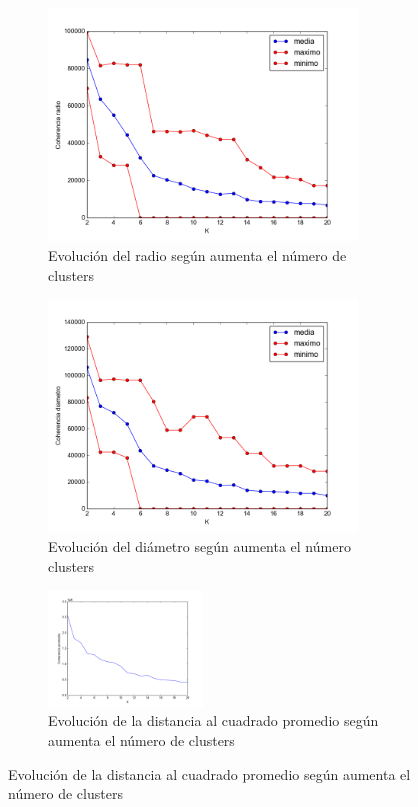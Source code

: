 \documentclass[11pt,a4paper]{article}
\begin{document}
\begin{figure}[h]
\begin{subfigure}{0.45\textwidth}
  \centering
    \includegraphics[width=0.9\textwidth]{img/radio_maxMin.png}
    \caption{Evolución del radio según aumenta el número de clusters}
    \label{fig:radio} 
\end{subfigure}
\hspace{0.1\textwidth}
\begin{subfigure}{0.45\textwidth}
    \includegraphics[width=0.9\textwidth]{img/diametro_maxMin.png}
    \caption{Evolución del diámetro según aumenta el número clusters}
    \label{fig:diametro}
\end{subfigure}
\begin{subfigure}{\textwidth}
  \centering
    \includegraphics[width=0.45\textwidth]{img/figure_P.png}
    \caption{Evolución de la distancia al cuadrado promedio según aumenta el número de clusters}
    \label{fig:promedio}
  \end{subfigure}


\end{figure}
\end{document}
